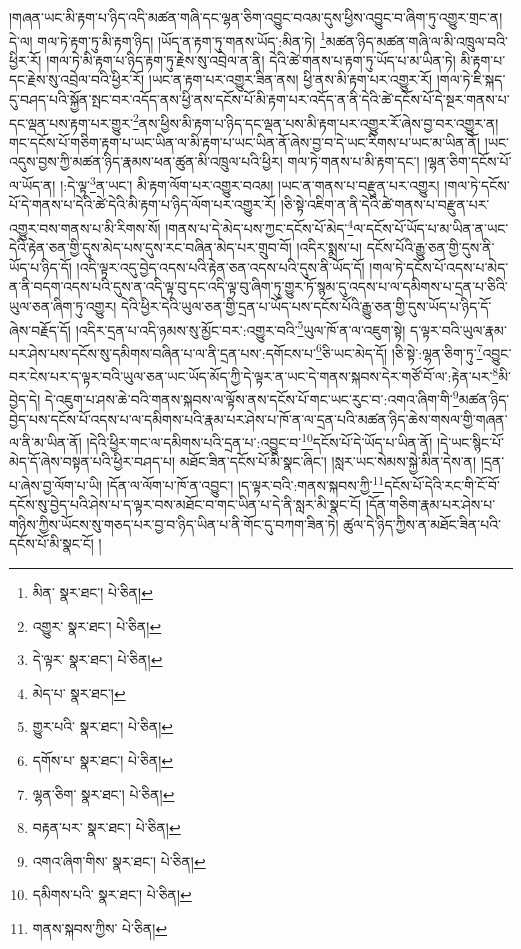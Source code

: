།གཞན་ཡང་མི་རྟག་པ་ཉིད་འདི་མཚན་གཞི་དང་ལྷན་ཅིག་འབྱུང་བའམ་དུས་ཕྱིས་འབྱུང་བ་ཞིག་ཏུ་འགྱུར་གྲང་ན། དེ་ལ། གལ་ཏེ་རྟག་ཏུ་མི་རྟག་ཉིད། །ཡོད་ན་རྟག་ཏུ་གནས་ཡོད་:མིན་ཏེ། \footnote{མིན་  སྣར་ཐང་།  པེ་ཅིན། }མཚན་ཉིད་མཚན་གཞི་ལ་མི་འཁྲུལ་བའི་ཕྱིར་རོ། །གལ་ཏེ་མི་རྟག་པ་ཉིད་རྟག་ཏུ་རྗེས་སུ་འབྲེལ་ན་ནི། དེའི་ཚེ་གནས་པ་རྟག་ཏུ་ཡོད་པ་མ་ཡིན་ཏེ། མི་རྟག་པ་དང་རྗེས་སུ་འབྲེལ་བའི་ཕྱིར་རོ། །ཡང་ན་རྟག་པར་འགྱུར་ཟིན་ནས། ཕྱི་ནས་མི་རྟག་པར་འགྱུར་རོ། །གལ་ཏེ་ཇི་སྐད་དུ་བཤད་པའི་སྐྱོན་སྤང་བར་འདོད་ནས་ཕྱི་ནས་དངོས་པོ་མི་རྟག་པར་འདོད་ན་ནི་དེའི་ཚེ་དངོས་པོ་དེ་སྔར་གནས་པ་དང་ལྡན་པས་རྟག་པར་གྱུར་\footnote{འགྱུར་  སྣར་ཐང་།  པེ་ཅིན། }ནས་ཕྱིས་མི་རྟག་པ་ཉིད་དང་ལྡན་པས་མི་རྟག་པར་འགྱུར་རོ་ཞེས་བྱ་བར་འགྱུར་ན། གང་དངོས་པོ་གཅིག་རྟག་པ་ཡང་ཡིན་ལ་མི་རྟག་པ་ཡང་ཡིན་ནོ་ཞེས་བྱ་བ་དེ་ཡང་རིགས་པ་ཡང་མ་ཡིན་ནོ། །ཡང་འདུས་བྱས་ཀྱི་མཚན་ཉིད་རྣམས་ཕན་ཚུན་མི་འཁྲུལ་པའི་ཕྱིར། གལ་ཏེ་གནས་པ་མི་རྟག་དང་། །ལྷན་ཅིག་དངོས་པོ་ལ་ཡོད་ན། །:དེ་ལྟ་\footnote{དེ་ལྟར་  སྣར་ཐང་།  པེ་ཅིན། }ན་ཡང་། མི་རྟག་ལོག་པར་འགྱུར་བའམ། །ཡང་ན་གནས་པ་བརྫུན་པར་འགྱུར། །གལ་ཏེ་དངོས་པོ་དེ་གནས་པ་དེའི་ཚེ་དེའི་མི་རྟག་པ་ཉིད་ལོག་པར་འགྱུར་རོ། །ཅི་སྟེ་འཇིག་ན་ནི་དེའི་ཚེ་གནས་པ་བརྫུན་པར་འགྱུར་བས་གནས་པ་མི་རིགས་སོ། །གནས་པ་དེ་མེད་པས་ཀྱང་དངོས་པོ་མེད་\footnote{མེད་པ་  སྣར་ཐང་། }ལ་དངོས་པོ་ཡོད་པ་མ་ཡིན་ན་ཡང་དེའི་རྟེན་ཅན་གྱི་དུས་མེད་པས་དུས་རང་བཞིན་མེད་པར་གྲུབ་བོ། །འདིར་སྨྲས་པ། དངོས་པོའི་རྒྱུ་ཅན་གྱི་དུས་ནི་ཡོད་པ་ཉིད་དོ། །འདི་ལྟར་འདུ་བྱེད་འདས་པའི་རྟེན་ཅན་འདས་པའི་དུས་ནི་ཡོད་དོ། །གལ་ཏེ་དངོས་པོ་འདས་པ་མེད་ན་ནི་བདག་འདས་པའི་དུས་ན་འདི་ལྟ་བུ་དང་འདི་ལྟ་བུ་ཞིག་ཏུ་གྱུར་ཏོ་སྙམ་དུ་འདས་པ་ལ་དམིགས་པ་དྲན་པ་ཅིའི་ཡུལ་ཅན་ཞིག་ཏུ་འགྱུར། དེའི་ཕྱིར་དེའི་ཡུལ་ཅན་གྱི་དྲན་པ་ཡོད་པས་དངོས་པོའི་རྒྱུ་ཅན་གྱི་དུས་ཡོད་པ་ཉིད་དོ་ཞེས་བརྗོད་དོ། །འདིར་དྲན་པ་འདི་ཉམས་སུ་མྱོང་བར་:འགྱུར་བའི་\footnote{གྱུར་པའི་  སྣར་ཐང་།  པེ་ཅིན། }ཡུལ་ཁོ་ན་ལ་འཇུག་སྟེ། ད་ལྟར་བའི་ཡུལ་རྣམ་པར་ཤེས་པས་དངོས་སུ་དམིགས་བཞིན་པ་ལ་ནི་དྲན་པས་:དགོངས་པ་\footnote{དགོས་པ་  སྣར་ཐང་།  པེ་ཅིན། }ཅི་ཡང་མེད་དོ། །ཅི་སྟེ་:ལྷན་ཅིག་ཏུ་\footnote{ལྷན་ཅིག་  སྣར་ཐང་།  པེ་ཅིན། }འབྱུང་བར་ངེས་པར་ད་ལྟར་བའི་ཡུལ་ཅན་ཡང་ཡོད་མོད་ཀྱི་དེ་ལྟར་ན་ཡང་དེ་གནས་སྐབས་དེར་གཙོ་བོ་ལ་:རྟེན་པར་\footnote{བརྟན་པར་  སྣར་ཐང་།  པེ་ཅིན། }མི་བྱེད་དེ། དེ་འཇུག་པ་ཤས་ཆེ་བའི་གནས་སྐབས་ལ་ལྟོས་ནས་དངོས་པོ་གང་ཡང་རུང་བ་:འགའ་ཞིག་གི་\footnote{འགའ་ཞིག་གིས་  སྣར་ཐང་།  པེ་ཅིན། }མཚན་ཉིད་བྱེད་པས་དངོས་པོ་འདས་པ་ལ་དམིགས་པའི་རྣམ་པར་ཤེས་པ་ཁོ་ན་ལ་དྲན་པའི་མཚན་ཉིད་ཆེས་གསལ་གྱི་གཞན་ལ་ནི་མ་ཡིན་ནོ། །དེའི་ཕྱིར་གང་ལ་དམིགས་པའི་དྲན་པ་:འབྱུང་བ་\footnote{དམིགས་པའི་  སྣར་ཐང་།  པེ་ཅིན། }དངོས་པོ་དེ་ཡོད་པ་ཡིན་ནོ། །དེ་ཡང་སྙིང་པོ་མེད་དོ་ཞེས་བསྟན་པའི་ཕྱིར་བཤད་པ། མཐོང་ཟིན་དངོས་པོ་མི་སྣང་ཞིང་། །སླར་ཡང་སེམས་སྐྱེ་མིན་དེས་ན། །དྲན་པ་ཞེས་བྱ་ལོག་པ་ཡི། །དོན་ལ་ལོག་པ་ཁོ་ན་འབྱུང་། །ད་ལྟར་བའི་:གནས་སྐབས་ཀྱི་\footnote{གནས་སྐབས་ཀྱིས་  པེ་ཅིན། }དངོས་པོ་དེའི་རང་གི་ངོ་བོ་དངོས་སུ་བྱེད་པའི་ཤེས་པ་ད་ལྟར་བས་མཐོང་བ་གང་ཡིན་པ་དེ་ནི་སླར་མི་སྣང་ངོ། །དོན་གཅིག་རྣམ་པར་ཤེས་པ་གཉིས་ཀྱིས་ཡོངས་སུ་གཅད་པར་བྱ་བ་ཉིད་ཡིན་པ་ནི་གོང་དུ་བཀག་ཟིན་ཏེ། ཚུལ་དེ་ཉིད་ཀྱིས་ན་མཐོང་ཟིན་པའི་དངོས་པོ་མི་སྣང་ངོ། །
